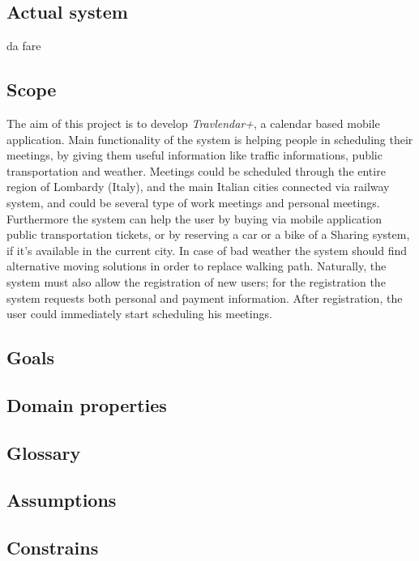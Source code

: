 \documentclass[12pt, a4paper]{article}
\begin{document}
		\subsection{Actual system}
			da fare
		
		\subsection{Scope}
		The aim of this project is to develop \textit{Travlendar+}, a calendar based mobile application.
Main functionality of the system is helping people in scheduling their meetings, by giving them useful information like traffic informations, public transportation and weather.
	Meetings could be scheduled through the entire region of Lombardy (Italy), and the main Italian cities connected via railway system, and could be several type of work meetings and personal meetings.
Furthermore the system can help the user by buying via mobile application public transportation tickets, or by reserving a car or a bike of a Sharing system, if it’s available in the current city.
In case of bad weather the system should find alternative moving solutions in order to replace walking path.
Naturally, the system must also allow the registration of new users; for the registration the system requests both personal and payment information. After registration, the user could immediately start scheduling his meetings.
			
		\subsection{Goals}
		
		\subsection{Domain properties}
		
		\subsection{Glossary}
		\subsection{Assumptions}
		

		\subsection{Constrains}			
\end{document}
